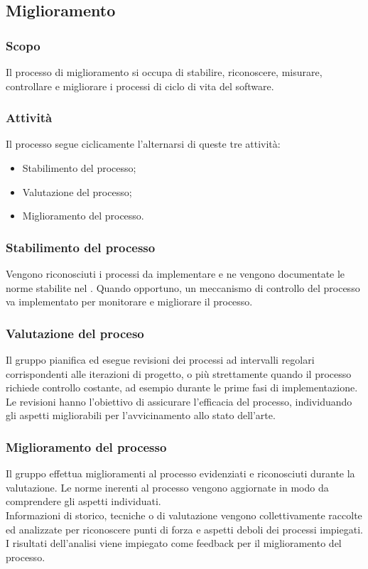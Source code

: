 \subsection{Miglioramento}
\subsubsection{Scopo}
Il processo di miglioramento si occupa di stabilire, riconoscere, misurare, controllare e migliorare i processi di ciclo di vita del software.

\subsubsection{Attività}
Il processo segue ciclicamente l'alternarsi di queste tre attività:
\begin{itemize}
  \item Stabilimento del processo;
  \item Valutazione del processo;
  \item Miglioramento del processo.
\end{itemize}

\subsubsection{Stabilimento del processo}
Vengono riconosciuti i processi da implementare e ne vengono documentate le norme stabilite nel \WoW. Quando opportuno, un meccanismo di controllo del processo va implementato per monitorare e migliorare il processo.

\subsubsection{Valutazione del proceso}
Il gruppo pianifica ed esegue revisioni dei processi ad intervalli regolari corrispondenti alle iterazioni di progetto, o più strettamente quando il processo richiede controllo costante, ad esempio durante le prime fasi di implementazione.\\
Le revisioni hanno l'obiettivo di assicurare l'efficacia del processo, individuando gli aspetti migliorabili per l'avvicinamento allo stato dell'arte.

\subsubsection{Miglioramento del processo}
Il gruppo effettua miglioramenti al processo evidenziati e riconosciuti durante la valutazione. Le norme inerenti al processo vengono aggiornate in modo da comprendere gli aspetti individuati.\\
Informazioni di storico, tecniche o di valutazione vengono collettivamente raccolte ed analizzate per riconoscere punti di forza e aspetti deboli dei processi impiegati. I risultati dell'analisi viene impiegato come feedback per il miglioramento del processo.
